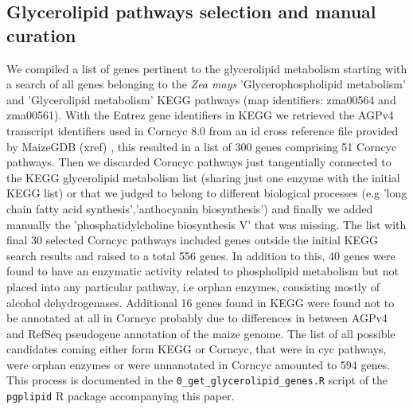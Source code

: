 \documentclass[9pt,twocolumn,twoside,lineno]{gsajnl}
\begin{document}
\subsection{Glycerolipid pathways selection and manual curation}
We compiled a list of genes pertinent to the glycerolipid metabolism starting with a search of all genes belonging to the \textit{Zea mays} 'Glycerophospholipid metabolism' and 'Glycerolipid metabolism' KEGG pathways \cite{kanehisa2019} (map identifiers: zma00564 and zma00561). With the Entrez gene identifiers in KEGG we retrieved the AGPv4 transcript identifiers used in Corncyc 8.0 \cite{portwood2019, walsh2016}from an id cross reference file provided by MaizeGDB (xref) \cite{portwood2019}, this resulted in a list of 300 genes comprising 51 Corncyc pathways. Then we discarded Corncyc pathways just tangentially connected to the KEGG glycerolipid metabolism list (sharing just one enzyme with the initial KEGG list) or that we judged to belong to different biological processes (e.g 'long chain fatty acid synthesis','anthocyanin biosynthesis') and finally we added manually the 'phosphatidylcholine biosynthesis V' that was missing. The list with final 30 selected Corncyc pathways included genes outside the initial KEGG search results and raised to a total 556 genes. In addition to this, 40 genes were found to have an enzymatic activity related to phospholipid metabolism but not placed into any particular pathway, i.e orphan enzymes, consisting mostly of alcohol dehydrogenases. Additional 16 genes found in KEGG were found not to be annotated at all in Corncyc probably due to differences in between AGPv4 and RefSeq pseudogene annotation of the maize genome. The list of all possible candidates coming either form KEGG or Corncyc, that were in cyc pathways, were orphan enzymes or were unnanotated in Corncyc amounted to 594 genes. This process is documented in the \verb|0_get_glycerolipid_genes.R| script of the \verb|pgplipid| R package accompanying this paper.
\end{document}
